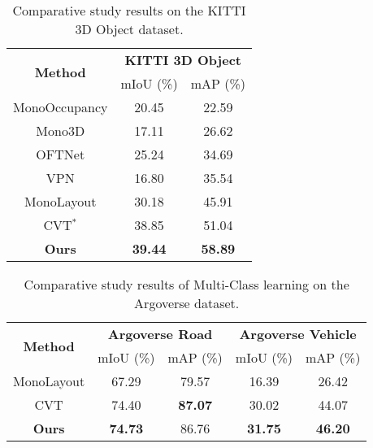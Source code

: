  \begin{table}[!t]
\caption{Comparative study results on the KITTI 3D Object dataset.}
\label{tb:result_comparative_3d}
\begin{center}
\begin{small}
\begin{tabular}{ccc}
\toprule
\multicolumn{1}{c}{\multirow{2}[2]{*}{\textbf{Method}}} & \multicolumn{2}{c}{\textbf{KITTI 3D Object}}\\ 
\cmidrule(lr){2-3}
 & mIoU (\%) & mAP (\%) \\

\midrule

MonoOccupancy \cite{lu2019monocular} & 20.45 & 22.59\\
Mono3D \cite{chen2016monocular}& 17.11 & 26.62\\
OFTNet \cite{roddick2019orthographic} & 25.24 & 34.69\\
VPN \cite{pan2020cross}& 16.80 & 35.54\\
MonoLayout \cite{mani2020monolayout}& 30.18 & 45.91\\
CVT$^{*}$ \cite{yang2021projecting} & 38.85 & 51.04\\ 
\midrule

\textbf{Ours}& \textbf{39.44} & \textbf{58.89} \\

\bottomrule
\end{tabular}
\end{small}
\end{center}
\end{table}
 \begin{table}[!t]
\caption{Comparative study results of Multi-Class learning on the Argoverse dataset.}
\label{tb:result_comparative_multiclass}
\begin{center}
\begin{footnotesize}
\begin{tabular}{ccccc}
\toprule
\multicolumn{1}{c}{\multirow{2}[2]{*}{\textbf{Method}}} & \multicolumn{2}{c}{\textbf{Argoverse Road}} & \multicolumn{2}{c}{\textbf{Argoverse Vehicle}} \\ 
\cmidrule(lr){2-5}
 & mIoU (\%) & mAP (\%) & mIoU (\%) & mAP (\%)  \\

\midrule
MonoLayout \cite{mani2020monolayout} & 67.29& 79.57 & 16.39 & 26.42 \\
CVT \cite{yang2021projecting} & 74.40 & \textbf{87.07} & 30.02& 44.07 \\
\midrule
\textbf{Ours} &\textbf{74.73}&86.76&\textbf{31.75}&\textbf{46.20}\\

\bottomrule
\end{tabular}
\end{footnotesize}
\end{center}
\end{table}

 